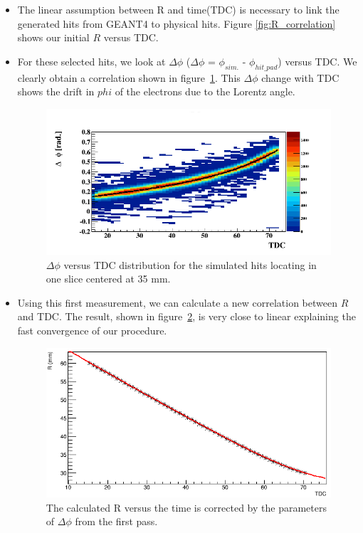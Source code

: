 \documentclass[twocolumn,showpacs,superscriptaddress,groupedaddress]{revtex4}
\begin{document}
\begin{itemize}

   \item The linear assumption between R and time(TDC) is necessary to link the 
      generated hits from GEANT4 to physical hits. Figure 
      \ref{fig:R_correlation} shows our initial $R$ versus TDC. 

   \item For these selected hits, we look at $\Delta\phi$ ($\Delta \phi$ = 
      $\phi_{sim.}$ - $\phi_{hit\_pad}$) versus TDC. We clearly obtain a 
      correlation shown in figure~\ref{fig:1st_pass_delta_phi}. This $\Delta 
      \phi$ change with TDC shows the drift in $phi$ of the electrons due to 
      the Lorentz angle. 

      \begin{figure}[tb]
         \centering
         \includegraphics[scale=0.37]{fig/TdcPhi_p1_10.png}
         \caption{$\Delta \phi$ versus TDC distribution for the simulated hits 
         locating in one slice centered at 35 mm.}
         \label{fig:1st_pass_delta_phi}
      \end{figure}

   \item Using this first measurement, we can calculate a new correlation 
      between $R$ and TDC. The result, shown in figure~\ref{fig:R_TDC}, is very 
      close to linear explaining the fast convergence of our procedure. 


      \begin{figure}[tb]
         \centering
         \includegraphics[scale=0.37]{fig/R_TDC.png}
         \caption{The calculated R versus the time is corrected by the 
         parameters of $\Delta \phi$ from the first pass.}
         \label{fig:R_TDC}
      \end{figure}



\end{itemize}
\end{document}
